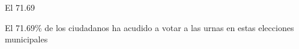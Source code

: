 \documentclass{article}
\begin{document}
El 71.69%

El 71.69\% de los ciudadanos ha acudido a votar a las urnas en estas 
elecciones municipales
\end{document}
